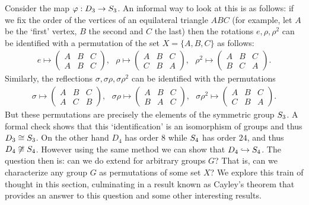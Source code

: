 Consider the map \(\varphi : D_3 \to S_{3}\). An informal way to look at this is
as follows: if we fix the order of the vertices of an equilateral triangle
\(ABC\) (for example, let \(A\) be the `first' vertex, \(B\) the second and
\(C\) the last) then the rotations \(e, \rho, \rho^2\) can be identified with a
permutation of the set \(X = \{A, B, C\}\) as follows:
\begin{align*}
    e \mapsto \begin{pmatrix} A & B & C \\ A & B & C \end{pmatrix},\text{ }
    \rho \mapsto \begin{pmatrix} A & B & C \\ C & B & A \end{pmatrix},\text{ }
    \rho^2 \mapsto \begin{pmatrix} A & B & C \\ B & C & A \end{pmatrix}.
\end{align*}
Similarly, the reflections \(\sigma, \sigma\rho, \sigma\rho^2\) can be
identified with the permutations
\begin{align*}
    \sigma \mapsto \begin{pmatrix} A & B & C \\ A & C & B \end{pmatrix},\text{ }
    \sigma\rho \mapsto \begin{pmatrix} A & B & C \\ B & A & C \end{pmatrix},\text{ }
    \sigma\rho^2 \mapsto \begin{pmatrix} A & B & C \\ C & B & A \end{pmatrix}.
\end{align*}
But these permutations are precisely the elements of the symmetric group
\(S_{3}\). A formal check shows that this `identification' is an isomorphism
of groups and thus \(D_3 \cong S_{3}\). On the other hand \(D_4\) has order
\(8\) while \(S_{4}\) has order \(24\), and thus \(D_4 \not\cong S_{4}\).
However using the same method we can show that \(D_4 \hookrightarrow S_{4}\).
The question then is: can we do extend for arbitrary groups \(G\)? That is, can
we characterize any group \(G\) as permutations of some set \(X\)? We explore
this train of thought in this section, culminating in a result known as Cayley's
theorem that provides an answer to this question and some other interesting
results.

